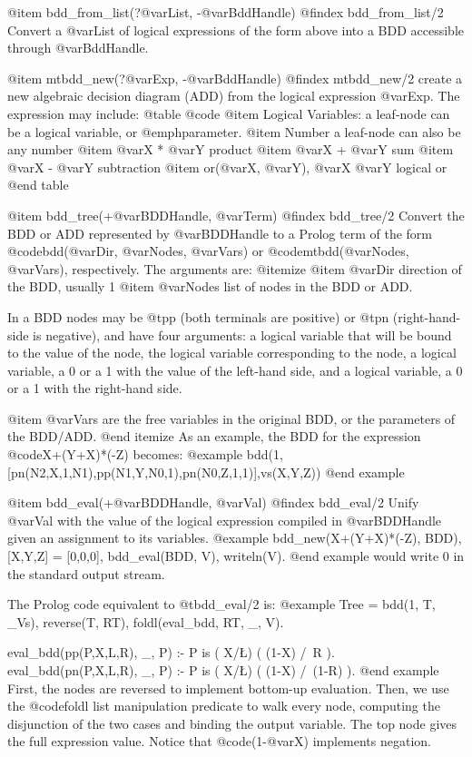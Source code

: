 @item bdd_from_list(?@var{List}, -@var{BddHandle})
@findex bdd_from_list/2
Convert a @var{List} of logical expressions of the form above into a BDD
accessible through @var{BddHandle}.

@item mtbdd_new(?@var{Exp}, -@var{BddHandle})
@findex mtbdd_new/2
create a new algebraic decision diagram (ADD) from the logical
expression @var{Exp}. The expression may include:
@table @code
@item  Logical Variables:
a leaf-node can be a logical variable, or @emph{parameter}.
@item Number
a leaf-node can also be any number
@item  @var{X} * @var{Y}
product
@item @var{X} + @var{Y}
sum
@item @var{X} - @var{Y}
subtraction
@item or(@var{X}, @var{Y}), @var{X} \/ @var{Y}
logical or
@end table

@item bdd_tree(+@var{BDDHandle}, @var{Term})
@findex bdd_tree/2
Convert the BDD or ADD represented by @var{BDDHandle} to a Prolog term
of the form @code{bdd(@var{Dir}, @var{Nodes}, @var{Vars})} or @code{mtbdd(@var{Nodes}, @var{Vars})}, respectively. The arguments are:
@itemize
@item
 @var{Dir} direction of the BDD, usually 1
@item
 @var{Nodes} list of nodes in the BDD or ADD. 

In a BDD nodes may be @t{pp} (both terminals are positive) or @t{pn}
 (right-hand-side is negative), and have four arguments: a logical
 variable that will be bound to the value of the node, the logical
 variable corresponding to the node, a logical variable, a 0 or a 1 with
 the value of the left-hand side, and a logical variable, a 0 or a 1
 with the right-hand side.

@item 
@var{Vars} are the free variables in the original BDD, or the parameters of the BDD/ADD.
@end itemize
As an example, the BDD for the expression @code{X+(Y+X)*(-Z)} becomes:
@example
bdd(1,[pn(N2,X,1,N1),pp(N1,Y,N0,1),pn(N0,Z,1,1)],vs(X,Y,Z))
@end example

@item bdd_eval(+@var{BDDHandle}, @var{Val})
@findex bdd_eval/2
Unify @var{Val} with the value of the logical expression compiled in
@var{BDDHandle} given an assignment to its  variables.
@example
bdd_new(X+(Y+X)*(-Z), BDD), 
[X,Y,Z] = [0,0,0], 
bdd_eval(BDD, V), 
writeln(V).
@end example
would write 0 in the standard output stream.

The  Prolog code equivalent to @t{bdd_eval/2} is:
@example
    Tree = bdd(1, T, _Vs),
    reverse(T, RT),
    foldl(eval_bdd, RT, _, V).

eval_bdd(pp(P,X,L,R), _, P) :-
    P is ( X/\L ) \/ ( (1-X) /\ R ).
eval_bdd(pn(P,X,L,R), _, P) :-
    P is ( X/\L ) \/ ( (1-X) /\ (1-R) ).
@end example
First, the nodes are reversed to implement bottom-up evaluation. Then,
we use the @code{foldl} list manipulation predicate to walk every node,
computing the disjunction of the two cases and binding the output
variable. The top node gives the full expression value. Notice that
@code{(1-@var{X})}  implements negation.

